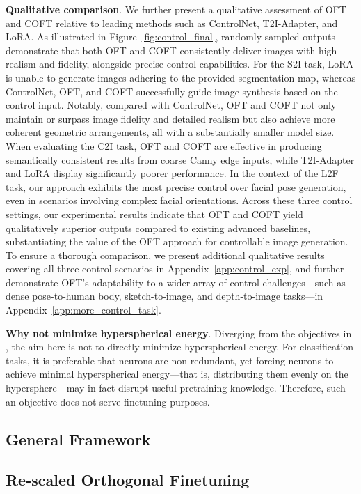 \textbf{Qualitative comparison}. We further present a qualitative assessment of OFT and COFT relative to leading methods such as ControlNet, T2I-Adapter, and LoRA. As illustrated in Figure~\ref{fig:control_final}, randomly sampled outputs demonstrate that both OFT and COFT consistently deliver images with high realism and fidelity, alongside precise control capabilities. For the S2I task, LoRA is unable to generate images adhering to the provided segmentation map, whereas ControlNet, OFT, and COFT successfully guide image synthesis based on the control input. Notably, compared with ControlNet, OFT and COFT not only maintain or surpass image fidelity and detailed realism but also achieve more coherent geometric arrangements, all with a substantially smaller model size. When evaluating the C2I task, OFT and COFT are effective in producing semantically consistent results from coarse Canny edge inputs, while T2I-Adapter and LoRA display significantly poorer performance. In the context of the L2F task, our approach exhibits the most precise control over facial pose generation, even in scenarios involving complex facial orientations. Across these three control settings, our experimental results indicate that OFT and COFT yield qualitatively superior outputs compared to existing advanced baselines, substantiating the value of the OFT approach for controllable image generation. To ensure a thorough comparison, we present additional qualitative results covering all three control scenarios in Appendix~\ref{app:control_exp}, and further demonstrate OFT’s adaptability to a wider array of control challenges—such as dense pose-to-human body, sketch-to-image, and depth-to-image tasks—in Appendix~\ref{app:more_control_task}.

\textbf{Why not minimize hyperspherical energy}. Diverging from the objectives in \cite{liu2021orthogonal}, the aim here is not to directly minimize hyperspherical energy. For classification tasks, it is preferable that neurons are non-redundant, yet forcing neurons to achieve minimal hyperspherical energy—that is, distributing them evenly on the hypersphere—may in fact disrupt useful pretraining knowledge. Therefore, such an objective does not serve finetuning purposes.

\subsection{General Framework}

\subsection{Re-scaled Orthogonal Finetuning}

